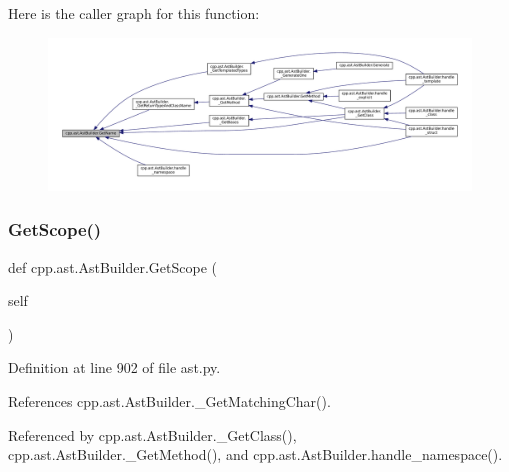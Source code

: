 Here is the caller graph for this function\+:
\nopagebreak
\begin{figure}[H]
\begin{center}
\leavevmode
\includegraphics[width=350pt]{classcpp_1_1ast_1_1AstBuilder_a327957c4228325fc5f64821b047bdc6f_icgraph}
\end{center}
\end{figure}
\mbox{\label{classcpp_1_1ast_1_1AstBuilder_add6826421ce64546a7dbb9b2e699a4d4}} 
\subsubsection{\texorpdfstring{Get\+Scope()}{GetScope()}}
{\footnotesize\ttfamily def cpp.\+ast.\+Ast\+Builder.\+Get\+Scope (\begin{DoxyParamCaption}\item[{}]{self }\end{DoxyParamCaption})}



Definition at line 902 of file ast.\+py.



References cpp.\+ast.\+Ast\+Builder.\+\_\+\+Get\+Matching\+Char().



Referenced by cpp.\+ast.\+Ast\+Builder.\+\_\+\+Get\+Class(), cpp.\+ast.\+Ast\+Builder.\+\_\+\+Get\+Method(), and cpp.\+ast.\+Ast\+Builder.\+handle\+\_\+namespace().


